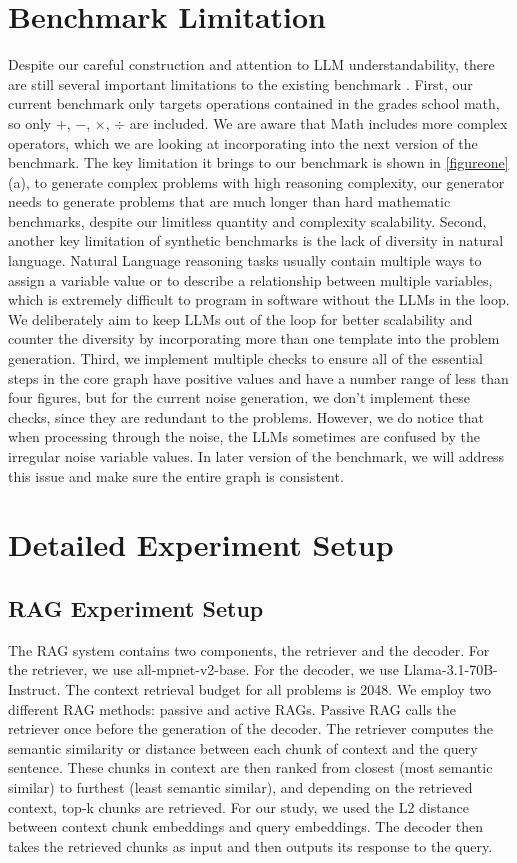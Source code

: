 \section{Benchmark Limitation} 
\label{limitation} 
Despite our careful construction and attention to LLM understandability, there are still several important limitations to the existing benchmark \sysb. First, our current benchmark only targets operations contained in the grades school math, so only +, $-$, $\times$, $\div$ are included. We are aware that Math \citep{hendrycks2021measuringmathematicalproblemsolving} includes more complex operators, which we are looking at incorporating into the next version of the benchmark. The key limitation it brings to our benchmark is shown in \cref{figureone}(a), to generate complex problems with high reasoning complexity, our generator needs to generate problems that are much longer than hard mathematic benchmarks, despite our limitless quantity and complexity scalability. Second, another key limitation of synthetic benchmarks is the lack of diversity in natural language. Natural Language reasoning tasks usually contain multiple ways to assign a variable value or to describe a relationship between multiple variables, which is extremely difficult to program in software without the LLMs in the loop. We deliberately aim to keep LLMs out of the loop for better scalability and counter the diversity by incorporating more than one template into the problem generation. Third, we implement multiple checks to ensure all of the essential steps in the core graph have positive values and have a number range of less than four figures, but for the current noise generation, we don't implement these checks, since they are redundant to the problems. However, we do notice that when processing through the noise, the LLMs sometimes are confused by the irregular noise variable values. In later version of the benchmark, we will address this issue and make sure the entire graph is consistent. 

\section{Detailed Experiment Setup} 
\subsection{RAG Experiment Setup} 
\label{setupr} 
The RAG system contains two components, the retriever and the decoder. For the retriever, we use all-mpnet-v2-base. For the decoder, we use Llama-3.1-70B-Instruct. The context retrieval budget for all problems is 2048. We employ two different RAG methods: passive and active RAGs. Passive RAG calls the retriever once before the generation of the decoder. The retriever computes the semantic similarity or distance between each chunk of context and the query sentence. These chunks in context are then ranked from closest (most semantic similar) to furthest (least semantic similar), and depending on the retrieved context, top-k chunks are retrieved. For our study, we used the L2 distance between context chunk embeddings and query embeddings. The decoder then takes the retrieved chunks as input and then outputs its response to the query. 

